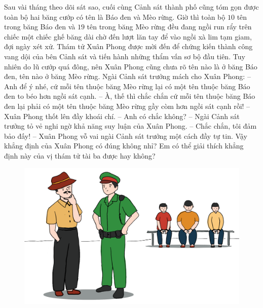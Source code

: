 \begin{multicols}{2}
	Sau vài tháng theo dõi sát sao, cuối cùng Cảnh sát thành phố cũng tóm gọn được toàn bộ hai băng cướp có tên là Báo đen và Mèo rừng. Giờ thì toàn bộ $10$ tên trong băng Báo đen và $19$ tên trong băng Mèo rừng đều đang ngồi run rẩy trên chiếc một chiếc ghế băng dài chờ đến lượt lăn tay để vào ngồi xà lim tạm giam, đợi ngày xét xử. Thám tử Xuân Phong được mời đến để chứng kiến thành công vang dội của bên Cảnh sát và tiến hành những thẩm vấn sơ bộ đầu tiên. Tuy nhiên do lũ cướp quá đông, nên Xuân Phong cũng chưa rõ tên nào là ở băng Báo đen, tên nào ở băng Mèo rừng. Ngài Cảnh sát trưởng mách cho Xuân Phong:
	\vskip 0.1cm
	--	Anh để ý nhé, cứ mỗi tên thuộc băng Mèo rừng lại có một tên thuộc băng Báo đen to béo hơn ngồi sát cạnh.
	\vskip 0.1cm
	--	À, thế thì chắc chắn cứ mỗi tên thuộc băng Báo đen lại phải có một tên thuộc băng Mèo rừng gầy còm hơn ngồi sát cạnh rồi! -- Xuân Phong thốt lên đầy khoái chí.
	\vskip 0.1cm
	--	Anh có chắc không? -- Ngài Cảnh sát trưởng tỏ vẻ nghi ngờ khả năng suy luận của Xuân Phong.
	\vskip 0.1cm
	--	Chắc chắn, tôi đảm bảo đấy! -- Xuân Phong vỗ vai ngài Cảnh sát trưởng một cách đầy tự tin.
	\vskip 0.1cm
	Vậy khẳng định của Xuân Phong có đúng không nhỉ? Em có thể giải thích khẳng định này của vị thám tử tài ba được hay không?
	\begin{figure}[H]
		\centering
		\vspace*{-5pt}
		\captionsetup{labelformat= empty, justification=centering}
		\includegraphics[width=1\linewidth]{xp}
		\vspace*{-10pt}
	\end{figure}
\end{multicols}
\newpage

